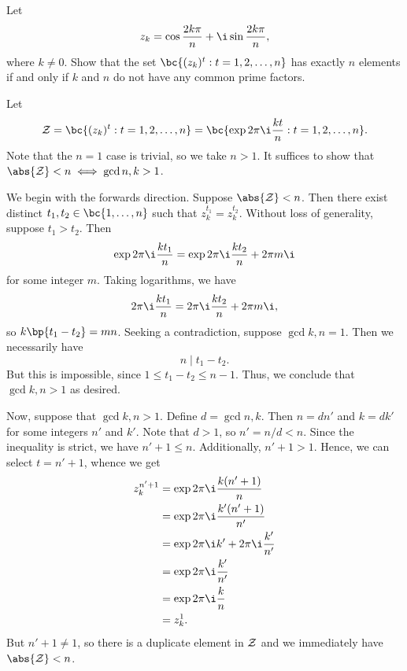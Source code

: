 \begin{solution}
\begin{center}
    \end{center}
\end{solution}

\begin{problem}
    Let \[z_k = \cos{\frac{2k\pi}{n}} + \i \sin{\frac{2k\pi}{n}},\] where $k \neq 0$. Show that the set $\bc{(z_k)^t : t = 1, 2, \dots, n}$ has exactly $n$ elements if and only if $k$ and $n$ do not have any common prime factors.
\end{problem}
\begin{solution}
    Let \[\Zc = \bc{(z_k)^t : t = 1, 2, \dots, n} = \bc{\exp{2\pi\i\frac{kt}{n}} : t = 1, 2, \dots, n}.\] Note that the $n = 1$ case is trivial, so we take $n > 1$. It suffices to show that $\abs{\Zc} < n \iff \gcd{n, k} > 1$.

    We begin with the forwards direction. Suppose $\abs{\Zc} < n$. Then there exist distinct $t_1, t_2 \in \bc{1, \dots, n}$ such that $z_k^{t_1} = z_k^{t_2}$. Without loss of generality, suppose $t_1 > t_2$. Then \[\exp{2\pi\i\frac{kt_1}{n}} = \exp{2\pi\i\frac{kt_2}{n} + 2\pi m \i}\] for some integer $m$. Taking logarithms, we have \[2\pi \i \frac{kt_1}{n} = 2\pi \i \frac{kt_2}{n} + 2\pi m \i,\] so $k\bp{t_1 - t_2} = mn$. Seeking a contradiction, suppose $\gcd{k, n} = 1$. Then we necessarily have \[n \mid t_1 - t_2.\] But this is impossible, since $1 \leq t_1 - t_2 \leq n-1$. Thus, we conclude that $\gcd{k, n} > 1$ as desired.

    Now, suppose that $\gcd{k, n} > 1$. Define $d = \gcd{n, k}$. Then $n = dn'$ and $k = dk'$ for some integers $n'$ and $k'$. Note that $d > 1$, so $n' = n/d < n$. Since the inequality is strict, we have $n' + 1 \leq n$. Additionally, $n' + 1 > 1$. Hence, we can select $t = n' + 1$, whence we get
    \begin{align*}
        z_k^{n' + 1} &= \exp{2\pi \i \frac{k (n' + 1)}{n}}\\
        &= \exp{2\pi \i \frac{k' (n' + 1)}{n'}}\\
        &= \exp{2\pi \i k' + 2\pi\i\frac{k'}{n'}}\\
        &= \exp{2\pi \i \frac{k'}{n'}}\\
        &= \exp{2\pi \i \frac{k}{n}}\\
        &= z_k^{1}.
    \end{align*}
    But $n' + 1 \neq 1$, so there is a duplicate element in $\mathcal{Z}$ and we immediately have $\abs{\Zc} < n$.
\end{solution}


